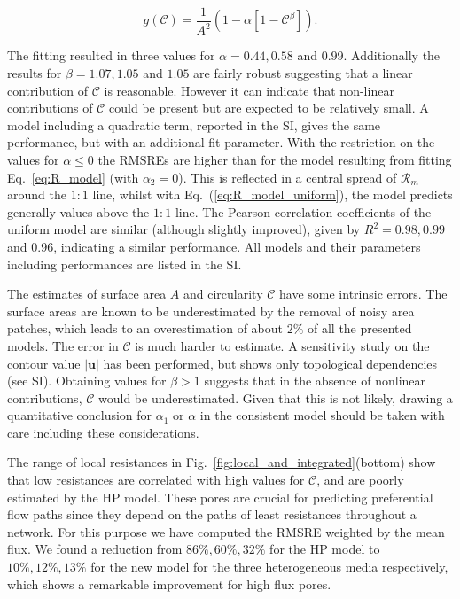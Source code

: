\documentclass[draft]{agujournal2019}
\begin{document}
\begin{equation}
	g(\mathcal{C}) = \frac{1}{A^2}\left(1-\alpha\left[1-\mathcal{C}^{\beta}\right] \right)\label{eq:R_model_uniform}.
\end{equation}

The fitting resulted in three values for $\alpha = 0.44, 0.58$ and $0.99$. Additionally the results for $\beta = 1.07,1.05$ and $1.05$ are fairly robust suggesting that a linear contribution of $\mathcal{C}$ is reasonable. However it can indicate that non-linear contributions of $\mathcal{C}$ could be present but are expected to be relatively small. A model including a quadratic term, reported in the SI, gives the same performance, but with an additional fit parameter. With the restriction on the values for $\alpha\leq0$ the RMSREs are higher than for the model resulting from fitting Eq.~\ref{eq:R_model} (with $\alpha_2 = 0$). This is reflected in a central spread of $\mathcal{R}_m$ around the $1:1$ line, whilst with Eq.~(\ref{eq:R_model_uniform}), the model predicts generally values above the $1:1$ line. The Pearson correlation coefficients of the uniform model are similar (although slightly improved), given by $R^2 = 0.98, 0.99$ and $0.96$, indicating a similar performance. All models and their parameters including performances are listed in the SI.


The estimates of surface area $A$ and circularity $\mathcal{C}$ have some intrinsic errors. The surface areas are known to be underestimated by the removal of noisy area patches, which leads to an overestimation of about $2\%$ of all the presented models. The error in $\mathcal{C}$ is much harder to estimate. A sensitivity study on the contour value $|\mathbf{u}|$ has been performed, but shows only topological dependencies (see SI). Obtaining values for $\beta>1$ suggests that in the absence of nonlinear contributions, $\mathcal{C}$ would be underestimated. Given that this is not likely, drawing a quantitative conclusion for $\alpha_1$ or $\alpha$ in the consistent model should be taken with care including these considerations.  

The range of local resistances in Fig.~\ref{fig:local_and_integrated}(bottom) show that low resistances are correlated with high values for $\mathcal{C}$, and are poorly estimated by the HP model. These pores are crucial for predicting preferential flow paths since they depend on the paths of least resistances throughout a network. For this purpose we have computed the RMSRE weighted by the mean flux. We found a reduction from $86\%, 60\%, 32\%$ for the HP model to $10\%, 12\%, 13\%$ for the new model for the three heterogeneous media respectively, which shows a remarkable improvement for high flux pores.  
\end{document}
